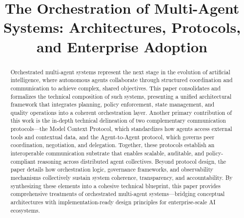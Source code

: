 \documentclass[conference]{IEEEtran}
\begin{document}
\title{The Orchestration of Multi-Agent Systems: Architectures, Protocols, and Enterprise Adoption}

\author{
\and
{}
\and
{}
}

\maketitle
\begin{abstract}
Orchestrated multi-agent systems represent the next stage in the evolution of artificial intelligence, where autonomous agents collaborate through structured coordination and communication to achieve complex, shared objectives. This paper consolidates and formalizes the technical composition of such systems, presenting a unified architectural framework that integrates planning, policy enforcement, state management, and quality operations into a coherent orchestration layer. Another primary contribution of this work is the in-depth technical delineation of two complementary communication protocols—the Model Context Protocol, which standardizes how agents access external tools and contextual data, and the Agent-to-Agent protocol, which governs peer coordination, negotiation, and delegation. Together, these protocols establish an interoperable communication substrate that enables scalable, auditable, and policy-compliant reasoning across distributed agent collectives. Beyond protocol design, the paper details how orchestration logic, governance frameworks, and observability mechanisms collectively sustain system coherence, transparency, and accountability. By synthesizing these elements into a cohesive technical blueprint, this paper provides comprehensive treatments of orchestrated multi-agent systems—bridging conceptual architectures with implementation-ready design principles for enterprise-scale AI ecosystems.

\end{abstract}
\end{document}
